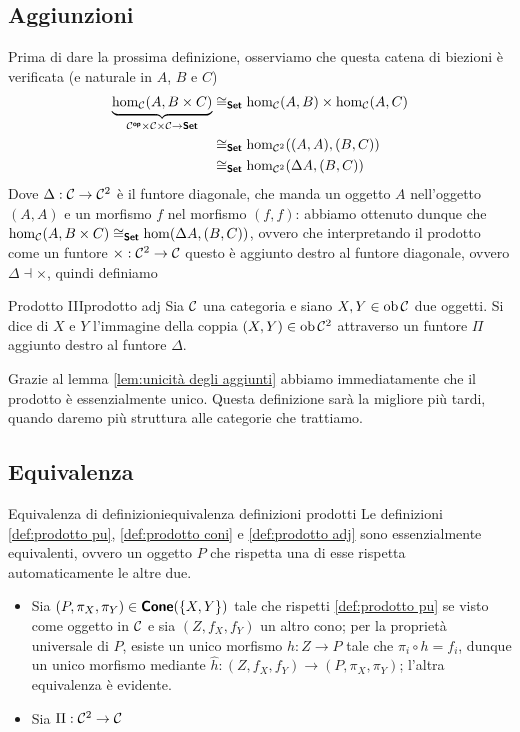 \documentclass{article}
\renewcommand\C{\mc{C}}
\begin{document}
\subsection{Aggiunzioni}

Prima di dare la prossima definizione, osserviamo che questa catena di biezioni è verificata (e naturale in $A$, $B$ e $C$)
\[\begin{aligned}
    \underbrace{\hom_\C(A, B\times C)}_{\C^\op \times \C\times\C \to \setcat} & \cong_\setcat \hom_\C(A,B)\times \hom_\C(A,C)\\
    & \cong_\setcat \hom_{\C^2}((A,A),(B,C))\\
    & \cong_\setcat \hom_{\C^2}(\Delta A,(B,C))
\end{aligned}\]
Dove $\Delta:\C\to\C^2$ è il funtore diagonale, che manda un oggetto $A$ nell'oggetto $(A,A)$ e un morfismo $f$ nel morfismo $(f,f)$: abbiamo ottenuto dunque che $\hom_\C(A, B\times C) \cong_\setcat \hom(\Delta A, (B,C))$, ovvero che interpretando il prodotto come un funtore $\times: \C^2\to\C$ questo è aggiunto destro al funtore diagonale, ovvero $\Delta \dashv \times$, quindi definiamo

\begin{definition}{Prodotto III}{prodotto adj}
    Sia $\C$ una categoria e siano $X,Y \in \ob\C$ due oggetti. 
    Si dice  di $X$ e $Y$ l'immagine della coppia $(X,Y) \in \ob\C^2$ attraverso un funtore $\Pi$ aggiunto destro al funtore $\Delta$.
\end{definition}

Grazie al lemma \ref{lem:unicità degli aggiunti} abbiamo immediatamente che il prodotto è essenzialmente unico. Questa definizione sarà la migliore più tardi, quando daremo più struttura alle categorie che trattiamo.

\subsection{Equivalenza}

\begin{theorem}{Equivalenza di definizioni}{equivalenza definizioni prodotti}
    Le definizioni \ref{def:prodotto pu}, \ref{def:prodotto coni} e \ref{def:prodotto adj} sono essenzialmente equivalenti, ovvero un oggetto $P$ che rispetta una di esse rispetta automaticamente le altre due.
    \proof 
    \begin{itemize}
        \item Sia $(P,\pi_X,\pi_Y) \in \text{\sffamily\textbf{Cone}}(\{X,Y\})$ tale che rispetti \ref{def:prodotto pu} se visto come oggetto in $\C$ e sia $(Z,f_X,f_Y)$ un altro cono; per la proprietà universale di $P$, esiste un unico morfismo $h : Z\to P$ tale che $\pi_i\circ h = f_i$, dunque un unico morfismo mediante $\hat h : (Z,f_X,f_Y)\to (P,\pi_X,\pi_Y)$; l'altra equivalenza è evidente.
        \item Sia $\Pi : \C^2 \to \C$ 
    \end{itemize}
\end{theorem}
\end{document}

